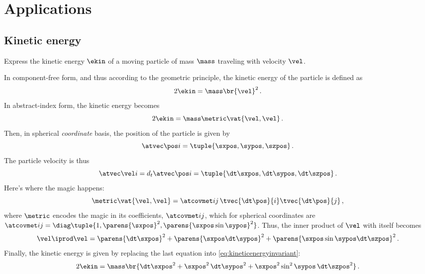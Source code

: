 
\section{Applications}
%
\subsection{Kinetic energy}
%
\begin{example}
  Express the kinetic energy $\ekin$ of a moving particle of mass $\mass$ traveling with velocity $\vel$.
\end{example}
%
\begin{solution}
  In component-free form, and thus according to the geometric principle, the kinetic energy of the particle is defined as
  \begin{equation*}
    2\ekin = \mass\br{\vel}^2\,.
  \end{equation*}
  In abstract-index form, the kinetic energy becomes
  \begin{equation*}
    2\ekin = \mass\metric\vat{\vel,\vel}\,.
  \end{equation*}
  Then, in spherical \emph{coordinate} basis, the position of the particle is given by
  \begin{equation*}
    \atvec\pos i = \tuple{\sxpos, \sypos, \szpos}\,.
  \end{equation*}
  The particle velocity is thus
  \begin{equation*}
    \atvec\vel i = d_t\atvec\pos i
                 = \tuple{\dt\sxpos, \dt\sypos, \dt\szpos}\,.
  \end{equation*}
  Here's where the magic happens:
  \begin{equation*}
    \metric\vat{\vel,\vel} = \atcovmet ij\,\tvec{\dt\pos}{i}\tvec{\dt\pos}{j}\,,
  \end{equation*}
  where $\metric$ encodes the magic in its coefficients, $\atcovmet ij$, which for spherical coordinates are $\atcovmet ij = \diag\tuple{1, \parens{\sxpos}^2, \parens{\sxpos\sin\sypos}^2}$. Thus, the inner product of $\vel$ with itself becomes
  \begin{equation*}
    \vel\iprod\vel = \parens{\dt\sxpos}^2 + \parens{\sxpos\dt\sypos}^2 + \parens{\sxpos\sin\sypos\dt\szpos}^2\,.
  \end{equation*}
  Finally, the kinetic energy is given by replacing the last equation into \cref{eq:kineticenergyinvariant}:
  \begin{equation*}
    2\ekin = \mass\br{\dt\sxpos^2 + \sxpos^2\,\dt\sypos^2 + \sxpos^2\sin^2\sypos\,\dt\szpos^2}\,.
  \end{equation*}
\end{solution}
